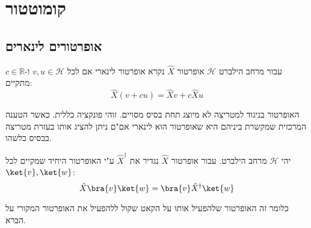 \documentclass{tstextbook}
\begin{document}
\section{קומוטטור}

\subsection{אופרטורים לינארים}

\begin{definition}
עבור מרחב הילברט \(\mathcal{H}\) אופרטור \(\hat{X}\) נקרא אופרטור לינארי אם לכל \(v,u \in \mathcal{H}\) ו-\(c \in \mathbb{R}\) מתקיים:
$$\hat{X}(v+cu)=\hat{X}v+c\hat{X}u$$

\end{definition}
האופרטור בניגוד למטריצה לא מיוצג תחת בסיס מסויים. זוהי פונקציה כללית. כאשר הטענה המרכזית שמקשרת ביניהם היא שאופרטור הוא לינארי אם"ם ניתן להציג אותו בעזרת מטריצה בבסיס כלשהו.

\begin{definition}
יהי \(\mathcal{H}\) מרחב הילברט. עבור אופרטור \(\hat{X}\) נגדיר את \(\hat{X}^{\dagger}\) ע"י האופרטור היחיד שמקיים לכל \(\ket{v},\ket{w}\):
$$\hat{X}\bra{v} \ket{w} =\bra{v} \hat{X}^{\dagger}\ket{w} $$

\end{definition}
כלומר זה האופרטור שלהפעיל אותו  על הקאט שקול ללהפעיל את האופרטור המקורי על הברא.
\end{document}
